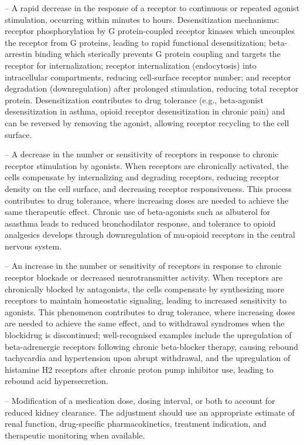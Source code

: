 -- A rapid decrease in the response of a receptor to continuous or repeated agonist stimulation, occurring within minutes to hours. Desensitization mechanisms: receptor phosphorylation by G protein-coupled receptor kinases which uncouples the receptor from G proteins, leading to rapid functional desensitization; beta-arrestin binding which sterically prevents G protein coupling and targets the receptor for internalization; receptor internalization (endocytosis) into intracellular compartments, reducing cell-surface receptor number; and receptor degradation (downregulation) after prolonged stimulation, reducing total receptor protein. Desensitization contributes to drug tolerance (e.g., beta-agonist desensitization in asthma, opioid receptor desensitization in chronic pain) and can be reversed by removing the agonist, allowing receptor recycling to the cell surface.

-- A decrease in the number or sensitivity of receptors in response to chronic receptor stimulation by agonists. When receptors are chronically activated, the cells compensate by internalizing and degrading receptors, reducing receptor density on the cell surface, and decreasing receptor responsiveness. This process contributes to drug tolerance, where increasing doses are needed to achieve the same therapeutic effect. Chronic use of beta-agonists such as albuterol for asasthma leads to reduced bronchodilator response, and tolerance to opioid analgesics develops through downregulation of mu-opioid receptors in the central nervous system.

-- An increase in the number or sensitivity of receptors in response to chronic receptor blockade or decreased neurotransmitter activity. When receptors are chronically blocked by antagonists, the cells compensate by synthesizing more receptors to maintain homeostatic signaling, leading to increased sensitivity to agonists. This phenomenon contributes to drug tolerance, where increasing doses are needed to achieve the same effect, and to withdrawal syndromes when the blockidrug is discontinued; well-recognised examples include the upregulation of beta-adrenergic receptors following chronic beta-blocker therapy, causing rebound tachycardia and hypertension upon abrupt withdrawal, and the upregulation of histamine H2 receptors after chronic proton pump inhibitor use, leading to rebound acid hypersecretion.

-- Modification of a medication dose, dosing interval, or both to account for reduced kidney clearance. The adjustment should use an appropriate estimate of renal function, drug-specific pharmacokinetics, treatment indication, and therapeutic monitoring when available.

